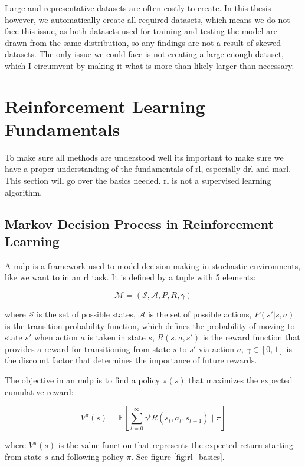 \documentclass[UKenglish]{uiomasterthesis}
\begin{document}
Large and representative datasets are often costly to create. In this thesis however, we automatically create all required datasets, which means we do not face this issue, as both datasets used for training and testing the model are drawn from the same distribution, so any findings are not a result of skewed datasets. The only issue we could face is not creating a large enough dataset, which I circumvent by making it what is more than likely larger than necessary. 

\section{Reinforcement Learning Fundamentals}
To make sure all methods are understood well its important to make sure we have a proper understanding of the fundamentals of \ac{rl}, especially \ac{drl} and \ac{marl}. This section will go over the basics needed. \ac{rl} is not a supervised learning algorithm.


\subsection{Markov Decision Process in Reinforcement Learning}

A \ac{mdp} is a framework used to model decision-making in stochastic environments, like we want to in an \ac{rl} task. It is defined by a tuple with 5 elements:

$$\mathcal{M} = (\mathcal{S}, \mathcal{A}, P, R, \gamma)$$

where \(\mathcal{S}\) is the set of possible states, \(\mathcal{A}\) is the set of possible actions, \(P(s' | s, a)\) is the transition probability function, which defines the probability of moving to state \(s'\) when action \(a\) is taken in state \(s\), \(R(s, a, s')\) is the reward function that provides a reward for transitioning from state \(s\) to \(s'\) via action \(a\), \(\gamma \in [0,1]\) is the discount factor that determines the importance of future rewards.

The objective in an \ac{mdp} is to find a policy \(\pi(s)\) that maximizes the expected cumulative reward:

$$V^\pi(s) = \mathbb{E} \left[ \sum_{t=0}^{\infty} \gamma^t R(s_t, a_t, s_{t+1}) \mid \pi \right]$$

where \(V^\pi(s)\) is the value function that represents the expected return starting from state \(s\) and following policy \(\pi\). See figure \ref{fig:rl_basics}.
\end{document}
